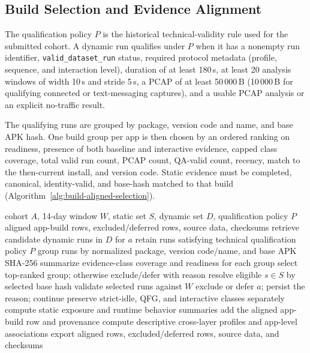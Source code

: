 \subsection{Build Selection and Evidence Alignment}

The qualification policy $P$ is the historical technical-validity rule used for the submitted cohort. A dynamic run qualifies under $P$ when it has a nonempty run identifier, \texttt{valid\_dataset\_run} status, required protocol metadata (profile, sequence, and interaction level), duration of at least 180\,s, at least 20 analysis windows of width 10\,s and stride 5\,s, a PCAP of at least 50\,000\,B (10\,000\,B for qualifying connected or text-messaging captures), and a usable PCAP analysis or an explicit no-traffic result.

The qualifying runs are grouped by package, version code and name, and base APK hash. One build group per app is then chosen by an ordered ranking on readiness, presence of both baseline and interactive evidence, capped class coverage, total valid run count, PCAP count, QA-valid count, recency, match to the then-current install, and version code. Static evidence must be completed, canonical, identity-valid, and base-hash matched to that build (Algorithm~\ref{alg:build-aligned-selection}).

\begin{algorithm}[!t]
\caption{Build-Aligned Static-Runtime Evidence Selection}
\label{alg:build-aligned-selection}
\begin{algorithmic}[1]
\REQUIRE cohort $A$, 14-day window $W$, static set $S$, dynamic set $D$, qualification policy $P$
\ENSURE aligned app-build rows, excluded/deferred rows, source data, checksums
  \STATE retrieve candidate dynamic runs in $D$ for $a$
  \STATE retain runs satisfying technical qualification policy $P$
  \STATE group runs by normalized package, version code/name, and base APK SHA-256
  \STATE summarize evidence-class coverage and readiness for each group
  \STATE select top-ranked group; otherwise exclude/defer with reason
  \STATE resolve eligible $s \in S$ by selected base hash
  \STATE validate selected runs against $W$
    \STATE exclude or defer $a$; persist the reason; continue
  \ENDIF
  \STATE preserve strict-idle, QFG, and interactive classes separately
  \STATE compute static exposure and runtime behavior summaries
  \STATE add the aligned app-build row and provenance
\ENDFOR
\STATE compute descriptive cross-layer profiles and app-level associations
\STATE export aligned rows, excluded/deferred rows, source data, and checksums
\end{algorithmic}
\end{algorithm}

